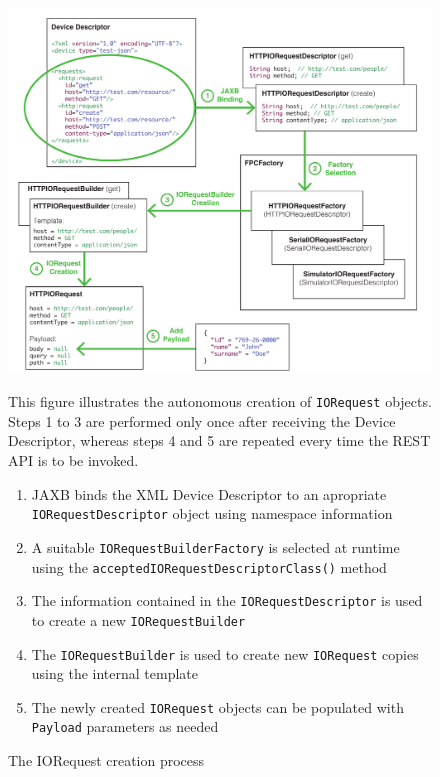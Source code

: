\begin{figure}[!hbt]
\includegraphics[width=\textwidth]{imgs/iorequest_creation_process.pdf}
\caption{The IORequest creation process}
\label{fig:iorequest.creation}
{
\begin{figurenote}
This figure illustrates the autonomous creation of \texttt{IORequest} objects. Steps 1 to 3 are performed only once after receiving the Device Descriptor, whereas steps 4 and 5 are repeated every time the REST API is to be invoked.
\begin{enumerate}
  \itemsep0em
  \item JAXB binds the XML Device Descriptor to an apropriate \texttt{IORequestDescriptor} object using namespace information
  \item A suitable \texttt{IORequestBuilderFactory} is selected at runtime using the \texttt{acceptedIORequestDescriptorClass()} method
  \item The information contained in the \texttt{IORequestDescriptor} is used to create a new \texttt{IORequestBuilder}
  \item The \texttt{IORequestBuilder} is used to create new \texttt{IORequest} copies using the internal template
  \item The newly created \texttt{IORequest} objects can be populated with \texttt{Payload} parameters as needed
\end{enumerate}
\end{figurenote}
}
\end{figure}

